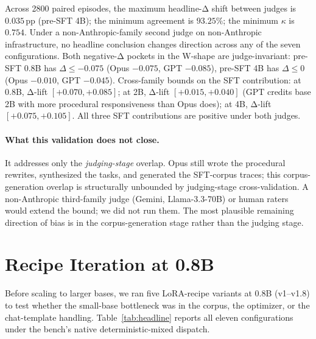 \documentclass[10pt]{article}
\begin{document}
Across 2800 paired episodes, the maximum headline-Δ shift between judges is $0.035$\,pp (pre-SFT 4B); the minimum agreement is $93.25\%$; the minimum $\kappa$ is $0.754$. Under a non-Anthropic-family second judge on non-Anthropic infrastructure, no headline conclusion changes direction across any of the seven configurations. Both negative-Δ pockets in the W-shape are judge-invariant: pre-SFT 0.8B has $\Delta \leq -0.075$ (Opus $-0.075$, GPT $-0.085$), pre-SFT 4B has $\Delta \leq 0$ (Opus $-0.010$, GPT $-0.045$). Cross-family bounds on the SFT contribution: at 0.8B, Δ-lift $[+0.070, +0.085]$; at 2B, Δ-lift $[+0.015, +0.040]$ (GPT credits base 2B with more procedural responsiveness than Opus does); at 4B, Δ-lift $[+0.075, +0.105]$. All three SFT contributions are positive under both judges.

\paragraph{What this validation does not close.} It addresses only the \emph{judging-stage} overlap. Opus still wrote the procedural rewrites, synthesized the tasks, and generated the SFT-corpus traces; this corpus-generation overlap is structurally unbounded by judging-stage cross-validation. A non-Anthropic third-family judge (Gemini, Llama-3.3-70B) or human raters would extend the bound; we did not run them. The most plausible remaining direction of bias is in the corpus-generation stage rather than the judging stage.

\section{Recipe Iteration at 0.8B}\label{sec:0.8b-iteration}

Before scaling to larger bases, we ran five LoRA-recipe variants at 0.8B (v1--v1.8) to test whether the small-base bottleneck was in the corpus, the optimizer, or the chat-template handling. Table~\ref{tab:headline} reports all eleven configurations under the bench's native deterministic-mixed dispatch.
\end{document}
